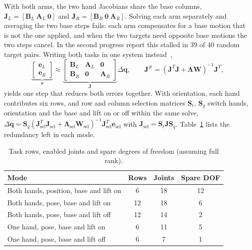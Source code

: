 \documentclass[12pt,a4paper]{article}
\begin{document}
With both arms, the two hand Jacobians share the base columns,
$\mathbf{J}_L=[\mathbf{B}_L\ \mathbf{A}_L\ \mathbf{0}]$ and $\mathbf{J}_R=[\mathbf{B}_R\ \mathbf{0}\ \mathbf{A}_R]$.
Solving each arm separately and averaging the two base steps fails: each arm compensates for a base
motion that is not the one applied, and when the two targets need opposite base motions the two
steps cancel. In the second progress report this stalled in 39 of 40 random target pairs. Writing
both tasks in one system instead~\cite{bussKim2004},
\begin{equation}
    \underbrace{\begin{bmatrix}\mathbf{e}_L\\ \mathbf{e}_R\end{bmatrix}}_{\mathbf{e}}
    \approx
    \underbrace{\begin{bmatrix}\mathbf{B}_L & \mathbf{A}_L & \mathbf{0}\\ \mathbf{B}_R & \mathbf{0} & \mathbf{A}_R\end{bmatrix}}_{\mathbf{J}}
    \Delta\mathbf{q},
    \qquad
    \mathbf{J}^{\#}=\left(\mathbf{J}^{T}\mathbf{J}+\boldsymbol{\Lambda}\mathbf{W}\right)^{-1}\mathbf{J}^{T},
    \label{eq:stacked}
\end{equation}
yields one step that reduces both errors together. With orientation, each hand contributes six
rows, and row and column selection matrices $\mathbf{S}_t$, $\mathbf{S}_q$ switch hands, orientation
and the base and lift on or off within the same solve,
$\Delta\mathbf{q}=\mathbf{S}_q(\mathbf{J}_{\mathrm{sel}}^{T}\mathbf{J}_{\mathrm{sel}}+\boldsymbol{\Lambda}_{\mathrm{sel}}\mathbf{W}_{\mathrm{sel}})^{-1}\mathbf{J}_{\mathrm{sel}}^{T}\mathbf{e}_{\mathrm{sel}}$
with $\mathbf{J}_{\mathrm{sel}}=\mathbf{S}_t\mathbf{J}\mathbf{S}_q$. Table~\ref{tab:modes} lists the
redundancy left in each mode.

\begin{table}[H]
    \centering
    \small
    \begin{tabular}{lccc}
        \toprule
        Mode & Rows & Joints & Spare DOF \\
        \midrule
        Both hands, position, base and lift on & 6 & 18 & 12 \\
        Both hands, pose, base and lift on & 12 & 18 & 6 \\
        Both hands, pose, base and lift off & 12 & 14 & 2 \\
        One hand, pose, base and lift on & 6 & 11 & 5 \\
        One hand, pose, base and lift off & 6 & 7 & 1 \\
        \bottomrule
    \end{tabular}
    \caption{\small{Task rows, enabled joints and spare degrees of freedom (assuming full rank).}}
    \label{tab:modes}
\end{table}
\end{document}
